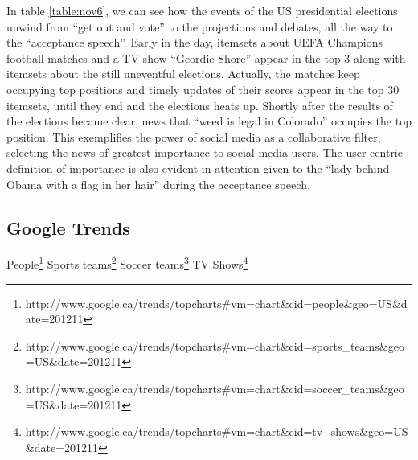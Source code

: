 \documentclass[letterpaper,12pt,titlepage,oneside,final]{book}
\begin{document}
In table \ref{table:nov6}, we can see how the events of the US presidential
elections  unwind from ``get out and vote'' to the projections and debates,
all the way to the ``acceptance speech''.
Early in the day, itemsets about UEFA Champions football matches and a TV show
``Geordie Shore'' appear in the top 3 along with itemsets about the still
uneventful elections.
Actually, the matches keep occupying top positions and timely updates of their
scores appear in the top 30 itemsets, until they end and the elections
heats up.
Shortly after the results of the elections became clear, news that
``weed is legal in Colorado'' occupies the top position.
This exemplifies the power of social media as a collaborative filter,
selecting the news of greatest importance to social media users.
The user centric definition of importance is also evident in attention
given to the ``lady behind Obama  with a flag in her hair'' during the
acceptance speech. 

\subsection{Google Trends}
\label{sec:gtrends}
People\footnote{http://www.google.ca/trends/topcharts\#vm=chart\&cid=people\&geo=US\&date=201211}
Sports teams\footnote{http://www.google.ca/trends/topcharts\#vm=chart\&cid=sports\_teams\&geo=US\&date=201211}
Soccer teams\footnote{http://www.google.ca/trends/topcharts\#vm=chart\&cid=soccer\_teams\&geo=US\&date=201211}
TV Shows\footnote{http://www.google.ca/trends/topcharts\#vm=chart\&cid=tv\_shows\&geo=US\&date=201211}
\end{document}
